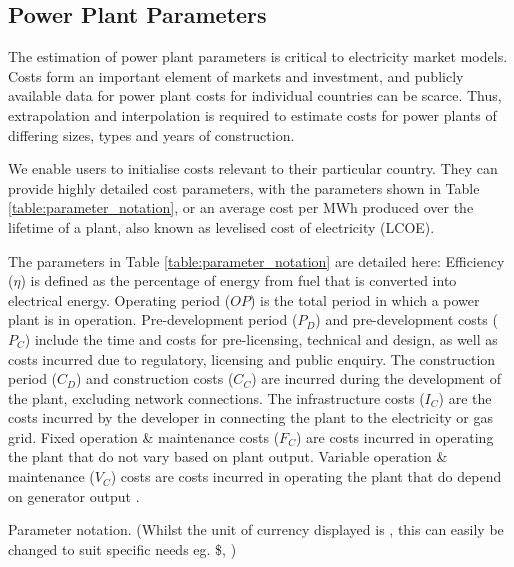 \subsection{Power Plant Parameters}\label{ssssec:powerplantparameters}



The estimation of power plant parameters is critical to electricity market models. Costs form an important element of markets and investment, and publicly available data for power plant costs for individual countries can be scarce. Thus, extrapolation and interpolation is required to estimate costs for power plants of differing sizes, types and years of construction.

We enable users to initialise costs relevant to their particular country. They can provide highly detailed cost parameters, with the parameters shown in Table \ref{table:parameter_notation}, or an average cost per MWh produced over the lifetime of a plant, also known as levelised cost of electricity (LCOE).

The parameters in Table \ref{table:parameter_notation} are detailed here: Efficiency ($\eta$) is defined as the percentage of energy from fuel that is converted into electrical energy. Operating period ($OP$) is the total period in which a power plant is in operation. Pre-development period ($P_D$) and pre-development costs ($P_C$) include the time and costs for pre-licensing, technical and design, as well as costs incurred due to regulatory, licensing and public enquiry. The construction period ($C_D$) and construction costs ($C_C$) are incurred during the development of the plant, excluding network connections. The infrastructure costs ($I_C$) are the costs incurred by the developer in connecting the plant to the electricity or gas grid. Fixed operation \& maintenance costs ($F_C$) are costs incurred in operating the plant that do not vary based on plant output. Variable operation \& maintenance ($V_C$) costs are costs incurred in operating the plant that do depend on generator output \cite{Ltd2016}.



\begin{table}[h]
	\centering
	\caption{Parameter notation. (Whilst the unit of currency displayed is \textsterling, this can easily be changed to suit specific needs eg. \$, \texteuro)}
	\label{table:parameter_notation}
\end{table}
\addtolength{\textfloatsep}{-0.2in}

